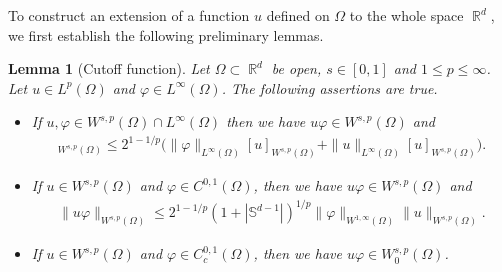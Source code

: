 \documentclass[12pt, reqno]{amsart}%
\theoremstyle{plain}  %
\newtheorem{lemma}[theorem]{Lemma}
\theoremstyle{definition}  %
\theoremstyle{remark}
\numberwithin{equation}{section}
\DeclareMathOperator{\R}{\mathbb{R}}
\begin{document}
To construct an extension of a function $u$ defined on $\Omega$ to the whole space $\R^d$, we first establish the following preliminary lemmas.
\begin{lemma}[Cutoff function]\label{lem:cutoff}
Let $\Omega\subset \R^d$ be open, $s\in[0,1]$ and
$1\leq p\leq \infty$.  Let $u\in L^p(\Omega)$ and $\varphi \in L^\infty(\Omega)$.  The following assertions are true.
\begin{itemize}
\item If $u, \varphi \in W^{s,p}(\Omega) \cap L^\infty(\Omega)$ then we have  $u\varphi \in W^{s,p}(\Omega)$ and
\begin{align*}
[u\varphi ]_{W^{s,p}(\Omega)}
\leq
2^{1-1/p}\big(\|\varphi\|_{L^\infty(\Omega)} [u]_{W^{s,p}(\Omega)}
+ \|u\|_{L^\infty(\Omega)}  [u]_{W^{s,p}(\Omega)}\big).
\end{align*}
\item If $u\in W^{s,p}(\Omega)$ and $\varphi\in C^{0,1}(\Omega)$, then we have  $u\varphi \in W^{s,p}(\Omega)$ and
\begin{align*}
\|u\varphi \|_{W^{s,p}(\Omega)}\leq  2^{1-1/p}(1+|\mathbb{S}^{d-1}|)^{1/p} \|\varphi\|_{W^{1,\infty}(\Omega)}  \|u\|_{W^{s,p}(\Omega)}.
\end{align*}
 \item If $u\in W^{s,p}(\Omega)$ and $\varphi\in C^{0,1}_c(\Omega)$, then we have  $u\varphi \in W^{s,p}_0(\Omega)$.
\end{itemize}
\end{lemma}
\end{document}
